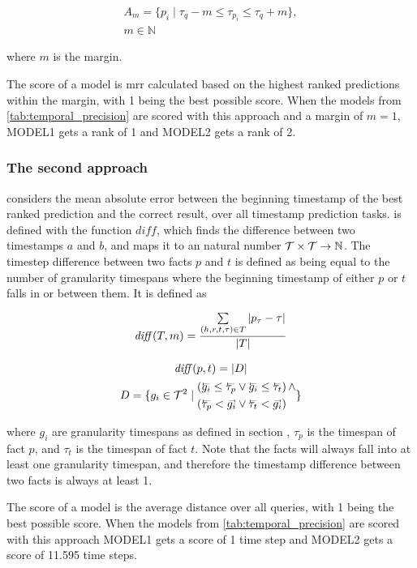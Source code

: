 \begin{equation}
\begin{gathered}
A_m = \{ p_i \mid \tau_{q} - m \le \tau_{p_i} \le \tau_{q} + m \},\\
m \in \mathbb{N}
\end{gathered}
\end{equation}

where $m$ is the margin. 

The score of a model is \gls{mrr} calculated based on the highest ranked predictions within the margin, with 1 being the best possible score.
When the models from \autoref{tab:temporal_precision} are scored with this approach and a margin of $m=1$, \textsc{MODEL1} gets a rank of 1 and \textsc{MODEL2} gets a rank of 2.

\subsubsection{The second approach}
considers the mean absolute error between the beginning timestamp of the best ranked prediction and the correct result, over all timestamp prediction tasks. is defined with the function $\mathit{diff}$, which finds the difference between two timestamps $a$ and $b$, and maps it to an natural number $\mathcal{T} \times \mathcal{T} \rightarrow \mathbb{N}$. The timestep difference between two facts $p$ and $t$ is defined as being equal to the number of granularity timespans where the beginning timestamp of either $p$ or $t$ falls in or between them. It is defined as

\begin{equation}
\mathit{diff}(T, m) = \frac{\sum\limits_{(h, r, t, \tau) \in T} | p_\tau - \tau | }{|T|}
\end{equation}

\begin{equation}
\begin{gathered}
\mathit{diff}(p, t) = |D|\\
D = \{ g_i \in \varT^2 \mid
\begin{aligned}
&(\timebegin{g_i} \le \timebegin{\tau_p} \vee \timebegin{g_i} \le \timebegin{\tau_t}) \, \wedge \\
&(\timebegin{\tau_p} < \timeend{g_i} \vee \timebegin{\tau_t} < \timeend{g_i})
\end{aligned}
\}
\end{gathered}
\end{equation}

\noindent
where $g_i$ are granularity timespans as defined in section \missing[X], $\tau_{p}$ is the timespan of fact $p$, and $\tau_t$ is the timespan of fact $t$. Note that the facts will always fall into at least one granularity timespan, and therefore the timestamp difference between two facts is always at least 1.

The score of a model is the average distance over all queries, with 1 being the best possible score. When the models from \autoref{tab:temporal_precision} are scored with this approach \textsc{MODEL1} gets a score of 1 time step and \textsc{MODEL2} gets a score of 11.595 time steps.


